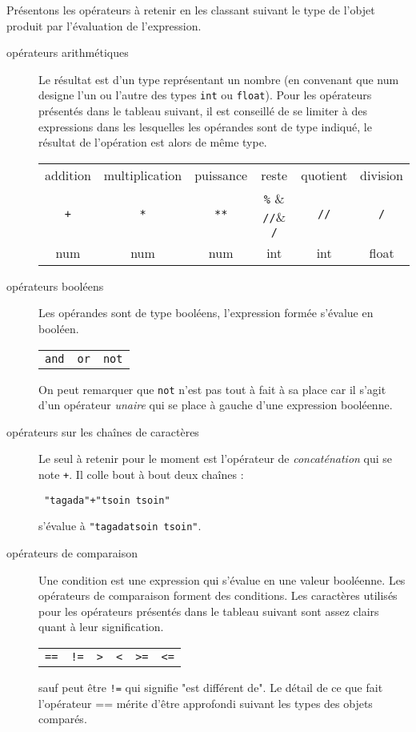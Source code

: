 Présentons les opérateurs à retenir en les classant suivant le type de l'objet produit par l'évaluation de l'expression.
\begin{description}
 \item[opérateurs arithmétiques] Le résultat est d'un type représentant un nombre (en convenant que num designe l'un ou l'autre des types \verb|int| ou \verb|float|). Pour les opérateurs présentés dans le tableau suivant, il est conseillé de se limiter à des expressions dans les lesquelles les opérandes sont de type indiqué, le résultat de l'opération est alors de même type.
 {%
\begin{center}
\begin{tabular}{cccccc}
addition & multiplication & puissance & reste & quotient & division \\
\verb|+| & \verb|*| & \verb|**| & \verb|%| & \verb|//|& \verb|/|    \\
num      & num      & num       & int      & int      & float    \\
 \end{tabular}
 \end{center}
}%

\item[opérateurs booléens] Les opérandes sont de type booléens, l'expression formée s'évalue en booléen. 
\begin{center}
\begin{tabular}{ccc}
\verb|and| & \verb|or| & \verb|not| \\
 \end{tabular}
\end{center}
On peut remarquer que \verb|not| n'est pas tout à fait à sa place car il s'agit d'un opérateur \emph{unaire} qui se place à gauche d'une expression booléenne.

\item[opérateurs sur les chaînes de caractères] Le seul à retenir pour le moment est l'opérateur de \emph{concaténation} qui se note \verb|+|.\newline
Il colle bout à bout deux chaînes :
\begin{verbatim}
 "tagada"+"tsoin tsoin"
\end{verbatim}
s'évalue à \verb|"tagadatsoin tsoin"|.

\item[opérateurs de comparaison] Une condition est une expression qui s'évalue en une valeur booléenne. Les opérateurs de comparaison forment des conditions. Les caractères utilisés pour les opérateurs présentés dans le tableau suivant sont assez clairs quant à leur signification. 
{%
\begin{center}
\begin{tabular}{cccccc}
\verb|==|  & \verb|!=| & \verb|>|  & \verb|<|  & \verb|>=|  &  \verb|<=|
 \end{tabular}
 \end{center}
}
sauf peut être \verb|!=| qui signifie "est différent de". Le détail de ce que fait l'opérateur == mérite d'être approfondi suivant les types des objets comparés.


\end{description}
